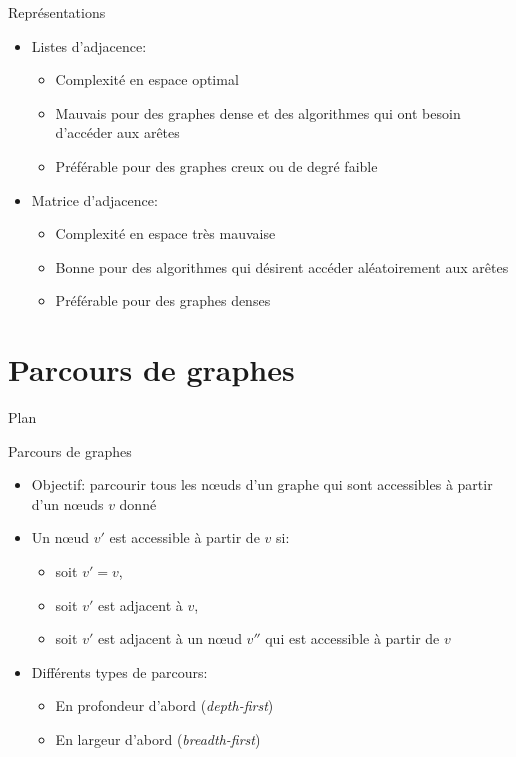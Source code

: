 \begin{frame}{Représentations}
\begin{itemize}
\item Listes d'adjacence:
\begin{itemize}
\item Complexité en espace optimal
\item Mauvais pour des graphes \alert{dense} et des algorithmes qui ont besoin d'accéder aux arêtes
\item Préférable pour des graphes \alert{creux} ou de degré faible
\end{itemize}

\bigskip

\item Matrice d'adjacence:
\begin{itemize}
\item Complexité en espace très mauvaise
\item Bonne pour des algorithmes qui désirent accéder aléatoirement aux arêtes
\item Préférable pour des graphes \alert{denses}
\end{itemize}
\end{itemize}

\end{frame}

\section{Parcours de graphes}

\begin{frame}{Plan}

\tableofcontents[currentsection]

\end{frame}

\begin{frame}{Parcours de graphes}
\begin{itemize}
\item Objectif: parcourir tous les n\oe uds d'un graphe qui sont accessibles à partir d'un n\oe uds $v$ donné
\item Un n\oe ud $v'$ est accessible à partir de $v$ si:
\begin{itemize}
\item soit $v'=v$,
\item soit $v'$ est adjacent à $v$,
\item soit $v'$ est adjacent à un n\oe ud $v''$ qui est accessible à partir de $v$
\end{itemize}

\bigskip

\item Différents types de parcours:
\begin{itemize}
\item En profondeur d'abord ({\it depth-first})
\item En largeur d'abord ({\it breadth-first})
\end{itemize}
\end{itemize}

\end{frame}

